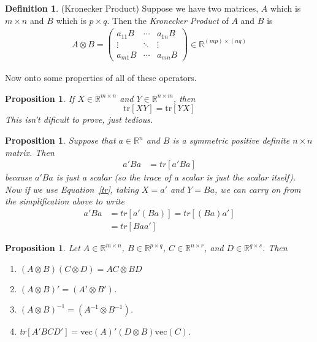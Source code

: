 \documentclass[12pt]{article}
\theoremstyle{plain}
\newtheorem{prop}[thm]{Proposition}
\theoremstyle{definition}
\newtheorem{defn}[thm]{Definition}
\theoremstyle{remark}
\newcommand{\R}{\mathbb{R}}
\newcommand{\Rn}{\mathbb{R}^n}
\newcommand{\Rmn}{\mathbb{R}^{m\times n}}
\newcommand{\Rnm}{\mathbb{R}^{n\times m}}
\begin{document}
\begin{defn}(Kronecker Product)
Suppose we have two matrices, $A$ which is $m \times n$ and $B$
which is $p\times q$. Then the {\sl Kronecker Product} of $A$ and $B$ is
\begin{align*}
  A \otimes B = \begin{pmatrix} a_{11} B & \cdots & a_{1n} B \\
      \vdots & \ddots & \vdots \\
      a_{m1} B & \cdots & a_{mn}B \end{pmatrix}
  \in \R^{(mp)\times(nq)}
\end{align*}
\end{defn}

Now onto some properties of all of these operators.

\begin{prop}
If $X\in\Rmn$ and $Y\in\Rnm$, then
\begin{equation}
    \label{tr}
    \text{tr}[XY] = \text{tr}[YX]
\end{equation}
This isn't dificult to prove, just tedious.
\end{prop}

\begin{prop}
Suppose that $a\in\Rn$ and $B$ is a symmetric positive definite
$n\times n$ matrix. Then
\begin{align*}
    a' B a &= tr\left[a' B a \right]
\end{align*}
because $a'Ba$ is just a scalar (so the trace of a scalar is just the
scalar itself).
Now if we use Equation~\ref{tr}, taking $X = a'$ and $Y = Ba$, we can
carry on from the simplification above to write
\begin{align*}
    a' B a &= tr\left[a' (B a) \right]
	= tr\left[(B a) a' \right]  \\
	&= tr\left[B a a' \right]
\end{align*}
\end{prop}




\begin{prop}
Let $A\in\Rmn$, $B\in\R^{p\times q}$, $C\in\R^{n\times r}$, and
$D\in\R^{q\times s}$. Then
\begin{enumerate}
  \item $(A \otimes B)(C \otimes D) = AC \otimes BD$
  \item $(A\otimes B)' = (A' \otimes B')$.
  \item $(A\otimes B)^{-1} = (A^{-1} \otimes B^{-1})$.
  \item tr$\left[A'BCD'\right] = \text{vec}(A)' (D \otimes B) \text{vec}(C)$.
\end{enumerate}
\end{prop}
\end{document}

